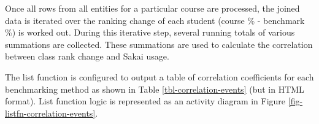 Once all rows from all entities for a particular course are processed, the joined data is iterated over the ranking change of each student (course \% - benchmark \%) is worked out. During this iterative step, several running totals of various summations are collected. These summations are used to calculate the correlation between class rank change and Sakai usage.

The list function is configured to output a table of correlation coefficients for each benchmarking method as shown in Table \ref{tbl-correlation-events} (but in HTML format). List function logic is represented as an activity diagram in Figure \ref{fig-listfn-correlation-events}.


